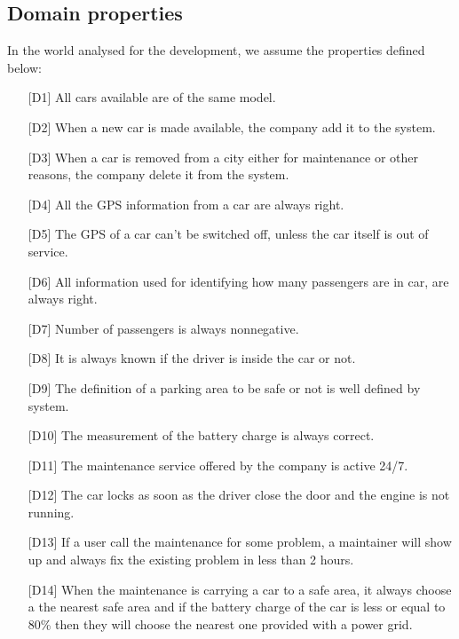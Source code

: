 \documentclass[10pt, a4paper,titlepage]{article}
\begin{document}
\subsection{Domain properties}
\label{sec:domain}
In the world analysed for the development, we assume the properties defined below:
\begin{itemize}
\item [{[D1]}] All cars available are of the same model.
\item [{[D2]}] When a new car is made available, the company add it to the system.
\item [{[D3]}] When a car is removed from a city either for maintenance or other reasons, the company delete it from the system.
\item [{[D4]}] All the GPS information from a car are always right.
\item [{[D5]}] The GPS of a car can't be switched off, unless the car itself is out of service.
\item [{[D6]}] All information used for identifying how many passengers are in car, are always right.
\item [{[D7]}] Number of passengers is always nonnegative.
\item [{[D8]}] It is always known if the driver is inside the car or not.
\item [{[D9]}] The definition of a parking area to be safe or not is well defined by system.
\item [{[D10]}] The measurement of the battery charge is always correct.
\item [{[D11]}] The maintenance service offered by the company is active 24/7.
\item [{[D12]}] The car locks as soon as the driver close the door and the engine is not running.
\item [{[D13]}] If a user call the maintenance for some problem, a maintainer will show up and always fix the existing problem in less than 2 hours.
\item [{[D14]}] When the maintenance is carrying a car to a safe area, it always choose a the nearest safe area and if the battery charge of the car is less or equal to 80\% then they will choose the nearest one provided with a power grid.
\end{itemize}
\end{document}
